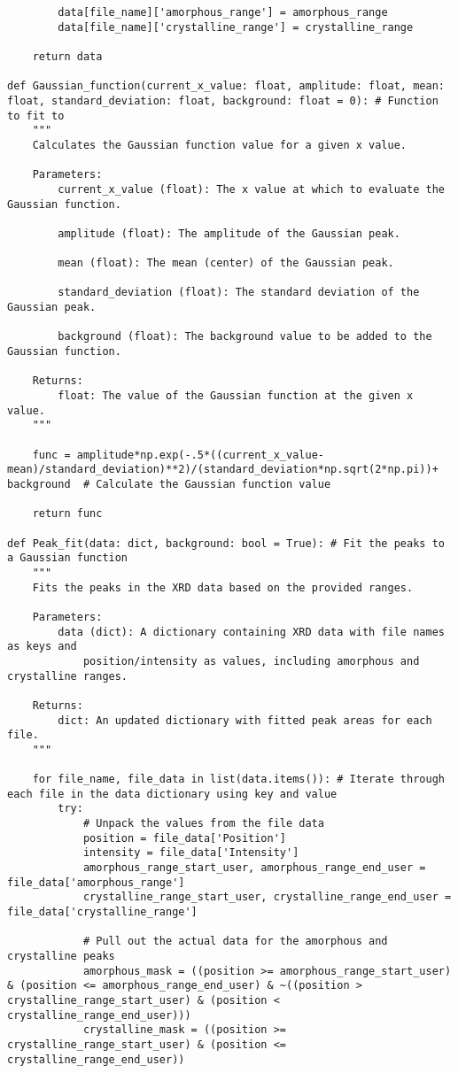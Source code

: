 \begin{small}
\begin{verbatim}
        data[file_name]['amorphous_range'] = amorphous_range
        data[file_name]['crystalline_range'] = crystalline_range

    return data

def Gaussian_function(current_x_value: float, amplitude: float, mean: float, standard_deviation: float, background: float = 0): # Function to fit to
    """
    Calculates the Gaussian function value for a given x value.

    Parameters:
        current_x_value (float): The x value at which to evaluate the Gaussian function.

        amplitude (float): The amplitude of the Gaussian peak.

        mean (float): The mean (center) of the Gaussian peak.

        standard_deviation (float): The standard deviation of the Gaussian peak.

        background (float): The background value to be added to the Gaussian function.

    Returns:
        float: The value of the Gaussian function at the given x value.
    """

    func = amplitude*np.exp(-.5*((current_x_value-mean)/standard_deviation)**2)/(standard_deviation*np.sqrt(2*np.pi))+ background  # Calculate the Gaussian function value

    return func

def Peak_fit(data: dict, background: bool = True): # Fit the peaks to a Gaussian function
    """
    Fits the peaks in the XRD data based on the provided ranges.

    Parameters:
        data (dict): A dictionary containing XRD data with file names as keys and 
            position/intensity as values, including amorphous and crystalline ranges.

    Returns:
        dict: An updated dictionary with fitted peak areas for each file.
    """

    for file_name, file_data in list(data.items()): # Iterate through each file in the data dictionary using key and value
        try:
            # Unpack the values from the file data
            position = file_data['Position']
            intensity = file_data['Intensity']
            amorphous_range_start_user, amorphous_range_end_user = file_data['amorphous_range']
            crystalline_range_start_user, crystalline_range_end_user = file_data['crystalline_range']

            # Pull out the actual data for the amorphous and crystalline peaks
            amorphous_mask = ((position >= amorphous_range_start_user) & (position <= amorphous_range_end_user) & ~((position > crystalline_range_start_user) & (position < crystalline_range_end_user)))
            crystalline_mask = ((position >= crystalline_range_start_user) & (position <= crystalline_range_end_user))


\end{verbatim}
\end{small}
